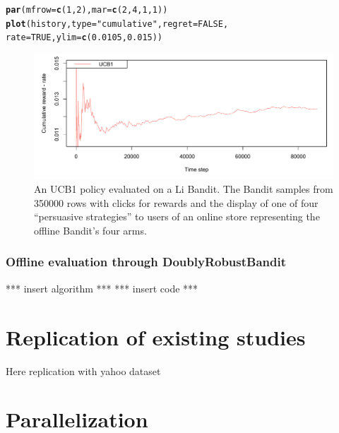 \documentclass{jss}\usepackage[]{graphicx}\usepackage[]{color}
\makeatletter
\newcommand{\hlnum}[1]{\textcolor[rgb]{0.686,0.059,0.569}{#1}}%
\newcommand{\hlstr}[1]{\textcolor[rgb]{0.192,0.494,0.8}{#1}}%
\newcommand{\hlstd}[1]{\textcolor[rgb]{0.345,0.345,0.345}{#1}}%
\newcommand{\hlkwc}[1]{\textcolor[rgb]{0.333,0.667,0.333}{#1}}%
\newcommand{\hlkwd}[1]{\textcolor[rgb]{0.737,0.353,0.396}{\textbf{#1}}}%
\newenvironment{kframe}{%
 \def\at@end@of@kframe{}%
 \ifinner\ifhmode%
  \def\at@end@of@kframe{\end{minipage}}%
  \begin{minipage}{\columnwidth}%
 \fi\fi%
 \def\FrameCommand##1{\hskip\@totalleftmargin \hskip-\fboxsep
 \colorbox{shadecolor}{##1}\hskip-\fboxsep
     \hskip-\linewidth \hskip-\@totalleftmargin \hskip\columnwidth}%
 \MakeFramed {\advance\hsize-\width
   \@totalleftmargin\z@ \linewidth\hsize
   \@setminipage}}%
 {\par\unskip\endMakeFramed%
 \at@end@of@kframe}
\newenvironment{knitrout}{}{} %
\makeatother
\begin{document}
\begin{knitrout}
\begin{kframe}
\begin{alltt}
\hlkwd{par}\hlstd{(}\hlkwc{mfrow} \hlstd{=} \hlkwd{c}\hlstd{(}\hlnum{1}\hlstd{,} \hlnum{2}\hlstd{),} \hlkwc{mar} \hlstd{=} \hlkwd{c}\hlstd{(}\hlnum{2}\hlstd{,}\hlnum{4}\hlstd{,}\hlnum{1}\hlstd{,}\hlnum{1}\hlstd{))}
\hlkwd{plot}\hlstd{(history,} \hlkwc{type} \hlstd{=} \hlstr{"cumulative"}\hlstd{,} \hlkwc{regret} \hlstd{=} \hlnum{FALSE}\hlstd{,}
     \hlkwc{rate} \hlstd{=} \hlnum{TRUE}\hlstd{,} \hlkwc{ylim} \hlstd{=} \hlkwd{c}\hlstd{(}\hlnum{0.0105}\hlstd{,} \hlnum{0.015}\hlstd{))}
\end{alltt}
\end{kframe}
\end{knitrout}

\begin{figure}[H]
  \centering
    \includegraphics[width=.99\textwidth]{fig/ucb_offline}

      \caption{An UCB1 policy evaluated on a Li Bandit. The Bandit samples from 350000 rows with clicks for rewards and the display of one of four “persuasive strategies” to users of an online store representing the offline Bandit's four arms.}
      \label{fig:ucb_offline}
\end{figure}

\subsubsection{Offline evaluation through DoublyRobustBandit}

*** insert algorithm ***
*** insert code ***

\section{Replication of existing studies}

Here replication with yahoo dataset

\section{Parallelization}
\end{document}
